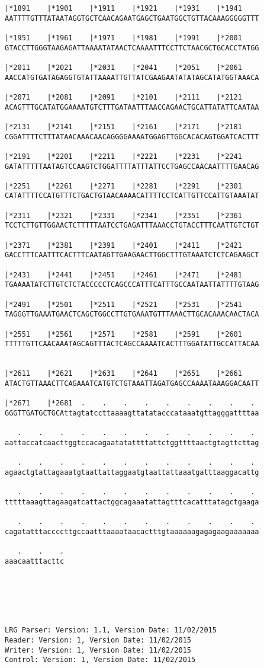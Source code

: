 \documentclass{article}
\begin{document}
\begin{Verbatim}
|*1891    |*1901    |*1911    |*1921    |*1931    |*1941    
AATTTTGTTTATAATAGGTGCTCAACAGAATGAGCTGAATGGCTGTTACAAAGGGGGTTT
  
|*1951    |*1961    |*1971    |*1981    |*1991    |*2001    
GTACCTTGGGTAAGAGATTAAAATATAACTCAAAATTTCCTTCTAACGCTGCACCTATGG
  
|*2011    |*2021    |*2031    |*2041    |*2051    |*2061    
AACCATGTGATAGAGGTGTATTAAAATTGTTATCGAAGAATATATAGCATATGGTAAACA
  
|*2071    |*2081    |*2091    |*2101    |*2111    |*2121    
ACAGTTTGCATATGGAAAATGTCTTTGATAATTTAACCAGAACTGCATTATATTCAATAA
  
|*2131    |*2141    |*2151    |*2161    |*2171    |*2181    
CGGATTTTCTTTATAACAAACAACAGGGGAAAATGGAGTTGGCACACAGTGGATCACTTT
  
|*2191    |*2201    |*2211    |*2221    |*2231    |*2241    
GATATTTTTAATAGTCCAAGTCTGGATTTTATTTATTCCTGAGCCAACAATTTTGAACAG
  
|*2251    |*2261    |*2271    |*2281    |*2291    |*2301    
CATATTTTCCATGTTTCTGACTGTAACAAAACATTTTCCTCATTGTTCCATTGTAAATAT
  
|*2311    |*2321    |*2331    |*2341    |*2351    |*2361    
TCCTCTTGTTGGAACTCTTTTTAATCCTGAGATTTAAACCTGTACCTTTCAATTGTCTGT
  
|*2371    |*2381    |*2391    |*2401    |*2411    |*2421    
GACCTTTCAATTTCACTTTCAATAGTTGAAGAACTTGGCTTTGTAAATCTCTCAGAAGCT
  
|*2431    |*2441    |*2451    |*2461    |*2471    |*2481    
TGAAAATATCTTGTCTCTACCCCCTCAGCCCATTTCATTTGCCAATAATTATTTTGTAAG
  
|*2491    |*2501    |*2511    |*2521    |*2531    |*2541    
TAGGGTTGAAATGAACTCAGCTGGCCTTGTGAAATGTTTAAACTTGCACAAACAACTACA
  
|*2551    |*2561    |*2571    |*2581    |*2591    |*2601    
TTTTTGTTCAACAAATAGCAGTTTACTCAGCCAAAATCACTTTGGATATTGCCATTACAA
  
  
|*2611    |*2621    |*2631    |*2641    |*2651    |*2661    
ATACTGTTAAACTTCAGAAATCATGTCTGTAAATTAGATGAGCCAAAATAAAGGACAATT
  
|*2671    |*2681  .    .    .    .    .    .    .    .    . 
GGGTTGATGCTGCAttagtatccttaaaagttatatacccataaatgttagggattttaa
  
   .    .    .    .    .    .    .    .    .    .    .    . 
aattaccatcaacttggtccacagaatatattttattctggttttaactgtagttcttag
  
   .    .    .    .    .    .    .    .    .    .    .    . 
agaactgtattagaaatgtaattattaggaatgtaattattaaatgatttaaggacattg
  
   .    .    .    .    .    .    .    .    .    .    .    . 
tttttaaagttagaagatcattactggcagaaatattagtttcacatttatagctgaaga
  
   .    .    .    .    .    .    .    .    .    .    .    . 
cagatatttaccccttgccaatttaaaataacactttgtaaaaaagagagaagaaaaaaa
  
   .    .    .
aaacaatttacttc






LRG Parser: Version: 1.1, Version Date: 11/02/2015
Reader: Version: 1, Version Date: 11/02/2015
Writer: Version: 1, Version Date: 11/02/2015
Control: Version: 1, Version Date: 11/02/2015
\end{Verbatim}
\end{document}
